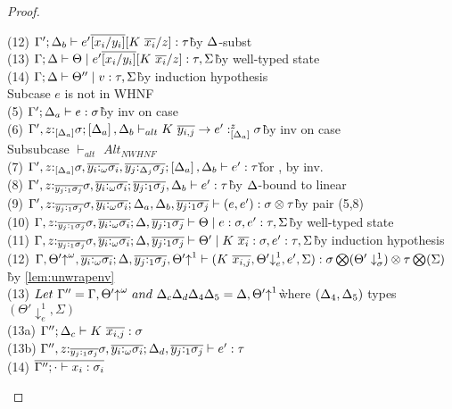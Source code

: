 \documentclass[acmsmall,review,screen]{acmart}
\begin{document}
\begin{proof}
\begin{description}
\begin{tabbing}
    (12) $\Gamma'; \Delta_b \vdash e'\overline{[x_i/y_i]}[K~\overline{x_i}/z] : \tau$\` by $\Delta$-subst\\
    (13) $\Gamma; \Delta \vdash \Theta \mid e'\overline{[x_i/y_i]}[K~\overline{x_i}/z] : \tau, \Sigma$\` by well-typed state\\
    (14) $\Gamma; \Delta \vdash \Theta'' \mid v : \tau, \Sigma$\`by induction hypothesis\\
    Subcase $e$ is not in WHNF\\
    (5) $\Gamma'; \Delta_a \vdash e : \sigma$\` by inv on case\\
    (6) $\Gamma', z{:}_{\left[\Delta_a\right]}\sigma; \left[\Delta_a\right], \Delta_b \vdash_{alt} K~\overline{y_{i,j}} \to e' :^z_{\left[\Delta_a\right]} \sigma $\` by inv on case\\
    Subsubcase $\vdash_{alt}$ $Alt_{NWHNF}$\\
    (7) $\Gamma', z{:}_{\left[\Delta_a\right]}\sigma, \overline{y_i{:}_\omega\sigma_i}, \overline{y_j{:}_{\Delta_j}\sigma_j}; \left[\Delta_a\right], \Delta_b \vdash e' : \tau$\` for , by inv.\\
    (8) $\Gamma', z{:}_{\overline{y_j{:}_1\sigma_j}}\sigma, \overline{y_i{:}_\omega\sigma_i}; \overline{y_j{:}_1\sigma_j}, \Delta_b \vdash e' : \tau$\` by $\Delta$-bound to linear\\
    (9) $\Gamma', z{:}_{\overline{y_j{:}_1\sigma_j}}\sigma, \overline{y_i{:}_\omega\sigma_i}; \Delta_a, \Delta_b, \overline{y_j{:}_1\sigma_j} \vdash (e, e') : \sigma \otimes \tau$\` by pair (5,8)\\
    (10) $\Gamma, z{:}_{\overline{y_j{:}_1\sigma_j}}\sigma, \overline{y_i{:}_\omega\sigma_i}; \Delta, \overline{y_j{:}_1\sigma_j} \vdash \Theta \mid e : \sigma, e':\tau, \Sigma$\`by well-typed state\\
    (11) $\Gamma, z{:}_{\overline{y_j{:}_1\sigma_j}}\sigma, \overline{y_i{:}_\omega\sigma_i}; \Delta, \overline{y_j{:}_1\sigma_j} \vdash \Theta' \mid K~\overline{x_i} : \sigma, e':\tau, \Sigma$\`by induction hypothesis\\
    (12) $\Gamma, \Theta'{\uparrow}^\omega, \overline{y_i{:}_\omega\sigma_i}; \Delta, \overline{y_j{:}_1\sigma_j}, \Theta'{\uparrow}^1 \vdash (K~\overline{x_{i,j}}, \Theta'{\downarrow}^1_e, e', \Sigma) : \sigma \bigotimes(\Theta'\downarrow^1_\sigma) \otimes \tau \bigotimes(\Sigma)$\`by \ref{lem:unwrapenv}\\
    (13) $Let~\Gamma''=\Gamma,\Theta'{\uparrow}^\omega~and~\Delta_c\Delta_d\Delta_4\Delta_5=\Delta,\Theta'{\uparrow}^1$\` where $(\Delta_4, \Delta_5)$ types $(\Theta'{\downarrow^1_e}, \Sigma)$\\
    (13a) $\Gamma''; \Delta_c \vdash K~\overline{x_{i,j}} : \sigma$\\
    (13b) $\Gamma'', z{:}_{\overline{y_j{:}_1\sigma_j}}\sigma, \overline{y_i{:}_\omega\sigma_i}; \Delta_d, \overline{y_j{:}_1\sigma_j} \vdash e' : \tau$\\
    (14) $\overline{\Gamma''; \cdot \vdash x_i : \sigma_i}$\\

\end{tabbing}
\end{description}
\end{proof}
\end{document}
